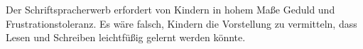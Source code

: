 Der Schriftspracherwerb erfordert von Kindern in hohem Maße Geduld und Frustrationstoleranz.
Es wäre falsch, Kindern die Vorstellung zu vermitteln, dass Lesen und Schreiben leichtfüßig gelernt werden könnte.